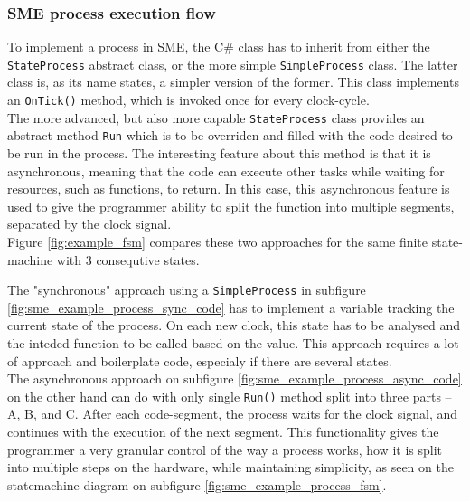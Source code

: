 \subsubsection{SME process execution flow}
To implement a process in SME, the C\# class has to inherit from
either the \texttt{StateProcess} abstract class, or the more simple
\texttt{SimpleProcess} class.
The latter class is, as its name states, a simpler version of the former. This
class implements an \texttt{OnTick()} method, which is invoked once for every
clock-cycle.\\
The more advanced, but also more capable \texttt{StateProcess}
class provides an abstract method \texttt{Run} which is to be overriden and filled
with the code desired to be run in the process. The interesting feature
about this method is that it is asynchronous, meaning that the code can
execute other tasks while waiting for resources, such as functions,
to return. In this case, this asynchronous feature is used to give
the programmer ability to split the function into multiple segments,
separated by the clock signal.\\
Figure \ref{fig:example_fsm} compares these two approaches for the same
finite state-machine with 3 consequtive states.

The "synchronous" approach using a \texttt{SimpleProcess} in subfigure
\ref{fig:sme_example_process_sync_code} has to implement a
variable tracking the current state of the process. On each new clock, this
state has to be analysed and the inteded function to be called based on the
value. This approach requires a lot of approach and boilerplate code, especialy
if there are several states.\\
The asynchronous approach on subfigure
\ref{fig:sme_example_process_async_code} on the other hand can do with only
single \texttt{Run()} method split into three parts -- A, B, and C.
After each code-segment, the process waits for the clock signal, and
continues with the execution of the next segment.  This functionality
gives the programmer a very granular control of the way a process
works, how it is split into multiple steps on the hardware, while
maintaining simplicity, as seen on the statemachine diagram on subfigure
\ref{fig:sme_example_process_fsm}.

